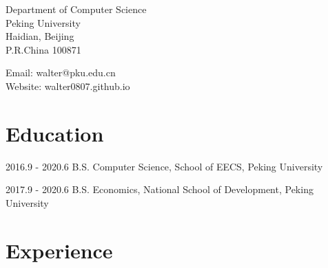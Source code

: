 \documentclass{academiccv}
\begin{document}
\raggedright


\vspace{1em}
\begin{minipage}[t]{0.495\textwidth}
  Department of Computer Science \\
 Peking University\\
  Haidian, Beijing\\
  P.R.China 100871
\end{minipage}
\begin{minipage}[t]{0.495\textwidth}
  Email: walter@pku.edu.cn \\
  Website: walter0807.github.io \\
\end{minipage}
\vspace{0.5em}


\section*{Education}

\begin{tablist}

\item[2016.9 - 2020.6]  \tab B.S. Computer Science, School of EECS, Peking University
\item[2017.9 - 2020.6]  \tab B.S. Economics, National School of Development, Peking University

\end{tablist}


\section*{Experience}
\end{document}
